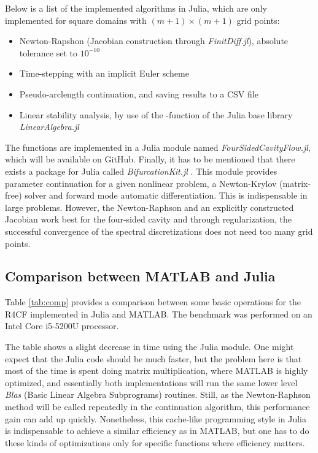 Below is a list of the implemented algorithms in Julia, which are only
implemented for square domains with $(m+1) \times (m+1)$ grid points:

\begin{itemize}
  \item Newton-Rapshon (Jacobian construction through \emph{FinitDiff.jl}),
    absolute tolerance set to $10^{-10}$
  \item Time-stepping with an implicit Euler scheme
  \item Pseudo-arclength continuation, and saving results to a CSV file
  \item Linear stability analysis, by use of the -function of the
    Julia base library \emph{LinearAlgebra.jl}
\end{itemize}

The functions are implemented in a Julia module named
\emph{FourSidedCavityFlow.jl}, which will be available on GitHub. Finally, it
has to be mentioned that there exists a package for Julia called
\emph{BifurcationKit.jl} \citep{veltz2020}. This module provides parameter
continuation for a given nonlinear problem, a Newton-Krylov (matrix-free)
solver and forward mode automatic differentiation. This is indispensable in
large problems. However, the Newton-Raphson and an explicitly constructed
Jacobian work best for the four-sided cavity and through regularization, the
successful convergence of the spectral discretizations does not need too many
grid points.

\subsection{Comparison between MATLAB and Julia}

Table \ref{tab:comp} provides a comparison between some basic operations for
the R4CF implemented in Julia and MATLAB. The benchmark was performed on an
Intel Core i5-5200U processor.

The table shows a slight decrease in time using the Julia module. One might
expect that the Julia code should be much faster, but the problem here is that
most of the time is spent doing matrix multiplication, where MATLAB is highly
optimized, and essentially both implementations will run the same lower level
\emph{Blas} (Basic Linear Algebra Subprograms) routines. Still, as the
Newton-Raphson method will be called repeatedly in the continuation algorithm,
this performance gain can add up quickly. Nonetheless, this cache-like
programming style in Julia is indispensable to achieve a similar efficiency as
in MATLAB, but one has to do these kinds of optimizations only for specific
functions where efficiency matters.


